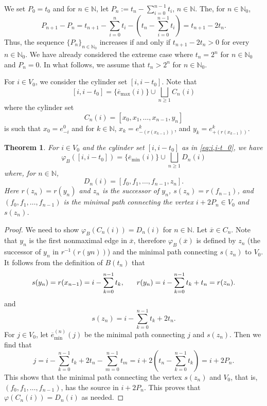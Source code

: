 \documentclass[11pt,reqno]{amsart}
\theoremstyle{definition}
\theoremstyle{remark}
\theoremstyle{plain}
\newtheorem{theorem}[definition]{Theorem}
\def\ol{\overline}
\newcommand{\N}{\mathbb N}
\numberwithin{equation}{section}
\begin{document}
We set $P_0 = t_0$ and for $ n \in \N$, let $P_n := t_n - \sum_{i=0}^{n-1} t_i$, $n \in \N$. The, for $n\in \N_0$, 
\[
P_{n+1} - P_n = t_{n+1} - \sum_{i=0}^{n} t_i - \left( t_n - \sum_{i=0}^{n-1} t_i \right) = t_{n+1} - 2 t_n.
\]
Thus, the sequence $\{P_n\}_{n\in \N_0}$ increases if and only if $t_{n+1} - 2 t_n >0$ for every $n \in \N_0$. We have already considered the extreme case where $t_n = 2^n$ for $n \in \N_0$ and 
$P_n =0$. In what follows, we assume that $t_n > 2^n$ for $n \in \N_0$.  

For $i\in V_0$, we consider the cylinder set $[i,i-t_0]$. Note  that
\begin{equation}\label{eq:i,i-t_0}
    [i,i-t_0] = \{\ol{e}_{\mathrm{max}} (i)\}\cup  \bigsqcup_{n\geq 1} C_n(i)
\end{equation}
where the cylinder set 
\begin{equation}\label{eq:i,C_n(i)}
    C_n(i) = [x_0,x_1,\ldots,x_{n-1},y_n]
\end{equation}
is such that $x_0 = e^0_{-i}$ and for $k \in \N$, $x_k = e^k_{-(r(x_{k-1}))}$, and $y_k = e^k_{+(r(x_{k-1}))}$. 

\begin{theorem}\label{thm:varphi_i_i-t0} 
For $i \in V_0$ and the cylinder set $[i,i-t_0]$ as in
\eqref{eq:i,i-t_0}, we have
\[
\varphi_B([i,i-t_0]) = \{\ol{e}_{\mathrm{min}} (i)\} \cup \bigsqcup_{n\geq 1} D_n(i)
\] where, for $n\in \N$,
\[
D_n(i) = [f_0,f_1,\ldots,f_{n-1},z_n].
\] 
Here $r(z_n) = r(y_n)$ and $z_n$ is the successor of $y_n$, $s(z_n) = r(f_{n-1})$, and $(f_0,f_1,\ldots,f_{n-1})$ is the minimal path connecting the vertex $i+2P_n \in V_0$ and $s(z_n)$. 
    
\end{theorem}

\begin{proof}
We need to show $\varphi_B(C_n(i)) = D_n(i)$ for $n \in \N$. Let $\overline{x} \in C_n$. Note that $y_n$ is the first nonmaximal edge in $\overline{x}$, therefore $\varphi_B(\overline{x})$ is defined by $z_n$ (the successor of $y_n$ in $r^{-1}(r(yn))$) and the minimal path connecting $s(z_n)$ to $V_0$. It follows from the definition of $B(t_n)$ that
\[
s(y_n) = r(x_{n-1}) = i - \sum_{k=0}^{n-1} t_k,\hspace{6mm} r(y_n) = i - \sum_{k=0}^{n-1} t_k + t_n = r(z_n).
\]
and 
\[
s(z_n) = i - \sum_{k=0}^{n-1} t_k + 2t_n.
\] 
For $j \in V_0$, let $\ol{e}_{\mathrm{min}}^{(n)} (j)$ be the minimal path connecting $j$ and $s(z_n)$. Then we find that 
\[
j = i - \sum_{k=0}^{n-1} t_k + 2t_n - \sum_{m=0}^{n-1} t_m = i + 2\left( t_n - \sum_{k=0}^{n-1} t_k\right) = i+2P_n.
\] 
This shows that the minimal path connecting the vertex $s(z_n)$ and $V_0$, that is, $(f_0,f_1,\ldots,f_{n-1})$, has the source in $i+ 2P_n$. This proves that $\varphi(C_n(i)) = D_n(i)$ as needed.
\end{proof}
\end{document}
